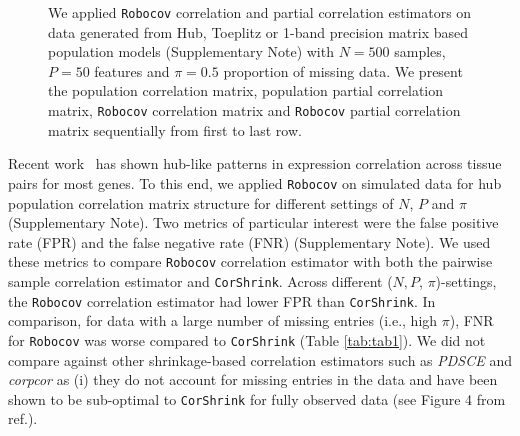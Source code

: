 \documentclass{bioinfo}
\def\CorShrink{\texttt{CorShrink}}
\def\Robocov{\texttt{Robocov}}
\begin{document}
\begin{figure}[!tpb]
\centering
{}
\caption{We applied \Robocov{} correlation and partial correlation estimators on data generated from Hub, Toeplitz or 1-band precision matrix based population models (Supplementary Note) with $N=500$ samples, $P=50$ features and $\pi=0.5$ proportion of missing data. We present the population correlation matrix, population partial correlation matrix, \Robocov{} correlation matrix and \Robocov{} partial correlation matrix sequentially from first to last row.}
\label{fig:sim_results}
\end{figure}


Recent work~\cite{dey2019} has shown hub-like patterns in expression correlation across tissue pairs for most genes. To this end, we applied \Robocov{} on simulated data for hub population correlation matrix structure for different settings of $N$, $P$ and $\pi$ (Supplementary Note). Two metrics of particular interest were the false positive rate (FPR) and the false negative rate (FNR) (Supplementary Note). We used these metrics to compare \Robocov{} correlation estimator with both the pairwise sample correlation estimator and  \CorShrink{}\cite{dey2019}. Across different ($N, P$, $\pi$)-settings, the \Robocov{} correlation estimator had lower FPR than \CorShrink{}. In comparison, for data with a large number of missing entries (i.e., high $\pi$), FNR for \Robocov{} was worse compared to \CorShrink{} (Table \ref{tab:tab1}). We did not compare against other shrinkage-based correlation estimators such as \textit{PDSCE}\cite{rothman2012} and \textit{corpcor}\cite{schafer2004empirical, schafer2005shrinkage} as (i) they do not account for missing entries in the data and have been shown to be sub-optimal to  \CorShrink{} for fully observed data (see Figure 4 from ref.\cite{dey2019}). 
\end{document}
